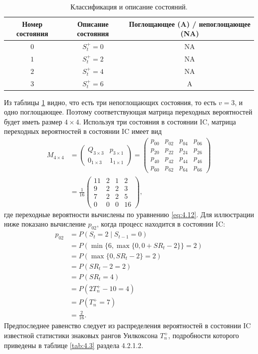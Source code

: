 \begin{table}[!ht]
	\centering
	\caption{Классификация и описание состояний.}
	\label{tab:4.14}
	\begin{tabular}{@{}ccc@{}}\toprule
		Номер состояния & Описание состояния & Поглощающее (A) / непоглощающее (NA) \\ \midrule
		\(0\) & \(S_t^+ = 0\) & NA \\
		\(1\) & \(S_t^+ = 2\) & NA \\
		\(2\) & \(S_t^+ = 4\) & NA \\
		\(3\) & \(S_t^+ = 6\) & A \\ \bottomrule
	\end{tabular}
\end{table}

Из таблицы \ref{tab:4.14} видно, что есть три непоглощающих состояния, то есть \(v = 3\), и одно поглощающее. Поэтому соответствующая матрица переходных вероятностей будет иметь размер \(4 \times 4\). Используя три состояния в состоянии IC, матрица переходных вероятностей в состоянии IC имеет вид
\begin{align*}
	M_{4\times4}
	&= \left(\begin{array}{c|c} Q_{3\times3} & p_{3\times1} \\ \hline 0_{1\times3} & 1_{1\times1} \end{array}\right)
	= \left(\begin{array}{ccc|c} p_{00} & p_{02} & p_{04} & p_{06} \\ p_{20} & p_{22} & p_{24} & p_{26} \\ p_{40} & p_{42} & p_{44} & p_{46} \\ \hline p_{60} & p_{62} & p_{64} & p_{66} \end{array}\right) \\
	&= \frac{1}{16}\left(\begin{array}{ccc|c} 11 & 2 & 1 & 2 \\ 9 & 2 & 2 & 3 \\ 7 & 2 & 2 & 5 \\ \hline 0 & 0 & 0 & 16 \end{array}\right),
\end{align*}
где переходные вероятности вычислены по уравнению \eqref{eq:4.12}. Для иллюстрации ниже показано вычисление \(p_{02}\), когда процесс находится в состоянии IC:
\begin{align*}
	p_{02} &= P(S_t = 2 \mid S_{t-1} = 0) \\
	       &= P(\min\{6, \max\{0, 0 + SR_t - 2\}\} = 2) \\
	       &= P(\max\{0, SR_t - 2\} = 2) \\
	       &= P(SR_t - 2 = 2) \\
	       &= P(SR_t = 4) \\
	       &= P(2T_n^+ - 10 = 4) \\
	       &= P(T_n^+ = 7) \\
	       &= \frac{2}{16}.
\end{align*}
Предпоследнее равенство следует из распределения вероятностей в состоянии IC известной статистики знаковых рангов Уилкоксона \(T_n^+\), подробности которого приведены в таблице \ref{tab:4.3} раздела 4.2.1.2.

